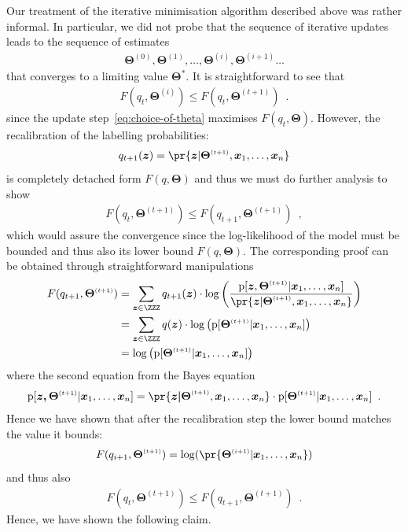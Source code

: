 \documentclass{article}
\renewcommand{\vec}[1]{\boldsymbol{#1}}
\newcommand{\pd}[1]{\mathrm{p}[#1]}
\newcommand{\supi}[1]{^{\scriptscriptstyle(#1)}}
\begin{document}
Our treatment of the iterative minimisation algorithm described above was rather informal. In particular, we did not probe that the sequence of iterative updates leads to the sequence of estimates 
\begin{align*}
\vec{\Theta}\supi{0},\vec{\Theta}\supi{1},\ldots,\vec{\Theta}\supi{i},\vec{\Theta}\supi{i+1}\ldots
\end{align*}
that converges to a limiting value $\vec{\Theta}^*$. It is straightforward to see that 
\begin{align*}
F(q_t,\vec{\Theta}\supi{i})\leq F(q_t,\vec{\Theta}\supi{t+1})\enspace.
\end{align*}
since the update step~\eqref{eq:choice-of-theta} maximises $F(q_t, \vec{\Theta})$. However, the recalibration of the labelling probabilities:
\begin{align*}
q_{t+1}(\vec{z})=\pr{\smash{\vec{z}|\vec{\Theta}\supi{t+1},\vec{x}_1,\ldots,\vec{x}_n}}
\end{align*}
is completely detached form $F(q,\vec{\Theta})$ and thus we must do further analysis to show 
\begin{align*}
F(q_t,\vec{\Theta}\supi{t+1})\leq F(q_{t+1},\vec{\Theta}\supi{t+1})\enspace,
\end{align*}
which would assure the convergence since the log-likelihood of the model must be bounded and thus also its lower bound $F(q,\vec{\Theta})$. The corresponding proof can be obtained through straightforward manipulations
\begin{align*}
F(q_{t+1},\vec{\Theta}\supi{t+1})%
&=\sum_{\vec{z}\in\ZZZ} q_{t+1}(\vec{z})\cdot
\log\left(\frac{\pd{\vec{z},\vec{\Theta}\supi{t+1}|\vec{x}_1,\ldots,\vec{x}_n}}
{\pr{\vec{z}|\vec{\Theta}\supi{t+1},\vec{x}_1,\ldots,\vec{x}_n}}\right)\\
&=\sum_{\vec{z}\in\ZZZ} q(\vec{z})\cdot
\log\left(\pd{\vec{\Theta}\supi{t+1}| \vec{x}_1,\ldots,\vec{x}_n}\right)\\ 
&=\log\left(\pd{\vec{\Theta}\supi{t+1}| \vec{x}_1,\ldots,\vec{x}_n}\right)
\end{align*}
where the second equation from the Bayes equation
\begin{align*}
\pd{\vec{\vec{z},\Theta}\supi{t+1}|\vec{x}_1,\ldots,\vec{x}_n} = %
\pr{\vec{\vec{z}|\Theta}\supi{t+1},\vec{x}_1,\ldots,\vec{x}_n}\cdot
\pd{\vec{\Theta}\supi{t+1}|\vec{x}_1,\ldots,\vec{x}_n} \enspace. 
\end{align*}
Hence we have shown that after the recalibration step the lower bound matches the value it bounds:
\begin{align*}
F(q_{i+1},\vec{\Theta}\supi{t+1})=\log(\pr{\vec{\Theta}\supi{i+1}|\vec{x}_1,\ldots,\vec{x}_n})
\end{align*}
and thus also 
\begin{align*}
F(q_{t},\vec{\Theta}\supi{t+1})\leq F(q_{t+1},\vec{\Theta}\supi{t+1})\enspace.
\end{align*}
Hence, we have shown the following claim.
\end{document}
